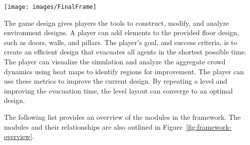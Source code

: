 \begin{figure*}
	\centering  \texttt{[image: images/FinalFrame]}
	\caption{\label{fig:framework-overview}The Game Framework overview}
\end{figure*}

The game design gives players the tools to construct, modify, and analyze environment designs.  A player can add elements to the provided floor design, such as doors, walls, and pillars. The player's goal, and success criteria, is to create an efficient design that evacuates all agents in the shortest possible time. The player can visualize the simulation and analyze the aggregate crowd dynamics using heat maps to identify regions for improvement. The player can use these metrics to improve the current design. By repeating a level and improving the evacuation time, the level layout can converge to an optimal design.

The following list provides an overview of the modules in the framework. The modules and their relationships are also outlined in Figure~\ref{fig:framework-overview}.

